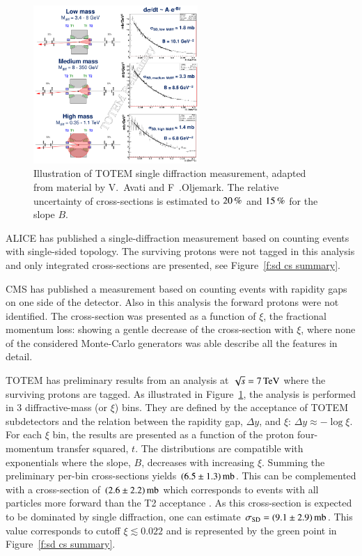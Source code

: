 \documentclass{webofc}
\def\un#1{\,{\rm #1}}
\begin{document}
\begin{figure}[h]
\centering
\includegraphics[height=6cm,clip]{fig/sd_7TeV.png}
\vskip-4mm
\caption{Illustration of TOTEM single diffraction measurement, adapted from material by V.~Avati and F~.Oljemark. The relative uncertainty of cross-sections is estimated to $20\un{\%}$ and $15\un{\%}$ for the slope $B$.}
\label{f:sd TOTEM}
\end{figure}

ALICE has published \cite{alice-inel-sd-dd} a single-diffraction measurement based on counting events with single-sided topology. The surviving protons were not tagged in this analysis and only integrated cross-sections are presented, see Figure~\ref{f:sd cs summary}.

CMS has published \cite{cms-diff-7tev} a measurement based on counting events with rapidity gaps on one side of the detector. Also in this analysis the forward protons were not identified. The cross-section was presented as a function of $\xi$, the fractional momentum loss: showing a gentle decrease of the cross-section with $\xi$, where none of the considered Monte-Carlo generators was able describe all the features in detail.

TOTEM has preliminary results \cite{totem-sd-7tev-prelim} from an analysis at $\sqrt s = 7\un{TeV}$ where the surviving protons are tagged. As illustrated in Figure~\ref{f:sd TOTEM}, the analysis is performed in 3 diffractive-mass (or $\xi$) bins. They are defined by the acceptance of TOTEM subdetectors and the relation between the rapidity gap, $\Delta y$, and $\xi$: $\Delta y \approx -\log\xi$. For each $\xi$ bin, the results are presented as a function of the proton four-momentum transfer squared, $t$. The distributions are compatible with exponentials where the slope, $B$, decreases with increasing $\xi$. Summing the preliminary per-bin cross-sections yields $(6.5\pm 1.3)\un{mb}$. This can be complemented with a cross-section of $(2.6\pm 2.2)\un{mb}$ which corresponds to events with all particles more forward than the T2 acceptance \cite{totem-si-inel-7tev}. As this cross-section is expected to be dominated by single diffraction, one can estimate $\sigma_{\rm SD} = (9.1 \pm 2.9)\un{mb}$. This value corresponds to cutoff $\xi \lesssim 0.022$ and is represented by the green point in Figure~\ref{f:sd cs summary}.
\end{document}
